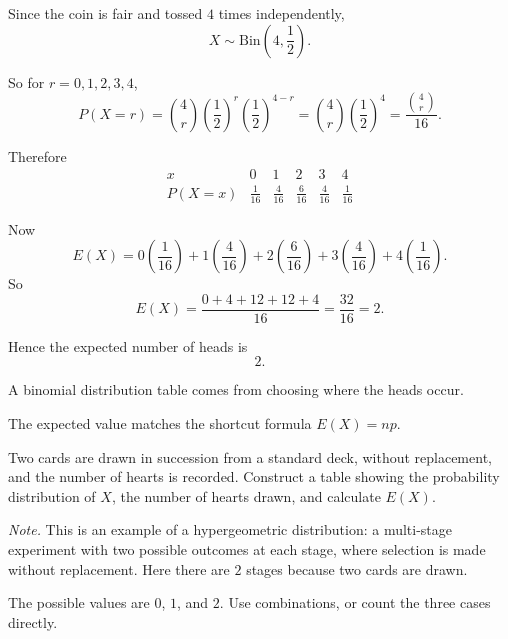 \begin{solution}
Since the coin is fair and tossed $4$ times independently,
\[
X\sim \mathrm{Bin}\left(4,\frac12\right).
\]

So for $r=0,1,2,3,4$,
\[
P(X=r)=\binom{4}{r}\left(\frac12\right)^r\left(\frac12\right)^{4-r}
=\binom{4}{r}\left(\frac12\right)^4
=\frac{\binom{4}{r}}{16}.
\]

Therefore
\[
\begin{array}{c|ccccc}
x & 0 & 1 & 2 & 3 & 4 \\
\hline
P(X=x) & \frac1{16} & \frac4{16} & \frac6{16} & \frac4{16} & \frac1{16}
\end{array}
\]

Now
\[
E(X)=0\left(\frac1{16}\right)+1\left(\frac4{16}\right)+2\left(\frac6{16}\right)+3\left(\frac4{16}\right)+4\left(\frac1{16}\right).
\]
So
\[
E(X)=\frac{0+4+12+12+4}{16}=\frac{32}{16}=2.
\]

Hence the expected number of heads is
\[
\boxed{2}.
\]
\end{solution}

\begin{takeaways}
\item A binomial distribution table comes from choosing where the heads occur.
\item The expected value matches the shortcut formula $E(X)=np$.
\end{takeaways}

\begin{problem}
Two cards are drawn in succession from a standard deck, without replacement, and the number of hearts is recorded. Construct a table showing the probability distribution of $X$, the number of hearts drawn, and calculate $E(X)$.

\medskip
\noindent\textit{Note.} This is an example of a hypergeometric distribution: a multi-stage experiment with two possible outcomes at each stage, where selection is made without replacement. Here there are $2$ stages because two cards are drawn.
\end{problem}

\begin{hint}
The possible values are $0$, $1$, and $2$. Use combinations, or count the three cases directly.
\end{hint}

